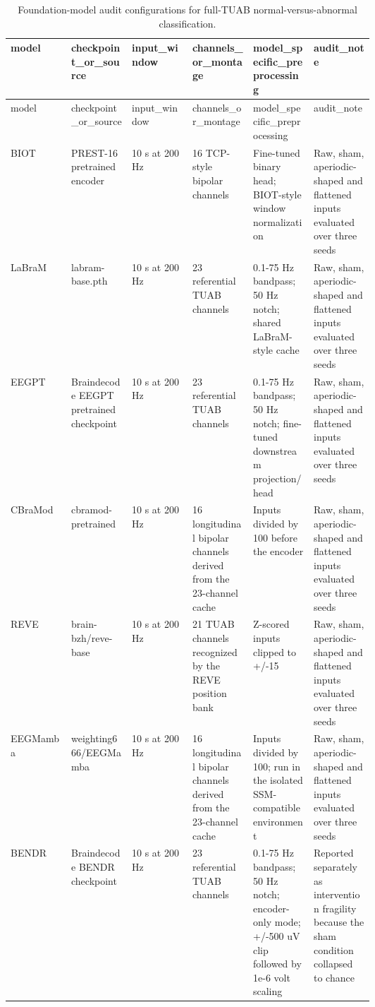 \begin{longtable}{p{0.10\linewidth}p{0.10\linewidth}p{0.10\linewidth}p{0.10\linewidth}p{0.10\linewidth}p{0.10\linewidth}}
\caption{Foundation-model audit configurations for full-TUAB normal-versus-abnormal classification.}\label{tab:fm_config}\\
\toprule
model & checkpoint\_or\_source & input\_window & channels\_or\_montage & model\_specific\_preprocessing & audit\_note\\
\midrule
\endfirsthead
\toprule
model & checkpoint\_or\_source & input\_window & channels\_or\_montage & model\_specific\_preprocessing & audit\_note\\
\midrule
\endhead
BIOT & PREST-16 pretrained encoder & 10 s at 200 Hz & 16 TCP-style bipolar channels & Fine-tuned binary head; BIOT-style window normalization & Raw, sham, aperiodic-shaped and flattened inputs evaluated over three seeds\\
LaBraM & labram-base.pth & 10 s at 200 Hz & 23 referential TUAB channels & 0.1-75 Hz bandpass; 50 Hz notch; shared LaBraM-style cache & Raw, sham, aperiodic-shaped and flattened inputs evaluated over three seeds\\
EEGPT & Braindecode EEGPT pretrained checkpoint & 10 s at 200 Hz & 23 referential TUAB channels & 0.1-75 Hz bandpass; 50 Hz notch; fine-tuned downstream projection/head & Raw, sham, aperiodic-shaped and flattened inputs evaluated over three seeds\\
CBraMod & cbramod-pretrained & 10 s at 200 Hz & 16 longitudinal bipolar channels derived from the 23-channel cache & Inputs divided by 100 before the encoder & Raw, sham, aperiodic-shaped and flattened inputs evaluated over three seeds\\
REVE & brain-bzh/reve-base & 10 s at 200 Hz & 21 TUAB channels recognized by the REVE position bank & Z-scored inputs clipped to +/-15 & Raw, sham, aperiodic-shaped and flattened inputs evaluated over three seeds\\
EEGMamba & weighting666/EEGMamba & 10 s at 200 Hz & 16 longitudinal bipolar channels derived from the 23-channel cache & Inputs divided by 100; run in the isolated SSM-compatible environment & Raw, sham, aperiodic-shaped and flattened inputs evaluated over three seeds\\
BENDR & Braindecode BENDR checkpoint & 10 s at 200 Hz & 23 referential TUAB channels & 0.1-75 Hz bandpass; 50 Hz notch; encoder-only mode; +/-500 uV clip followed by 1e-6 volt scaling & Reported separately as intervention fragility because the sham condition collapsed to chance\\
\bottomrule
\end{longtable}
